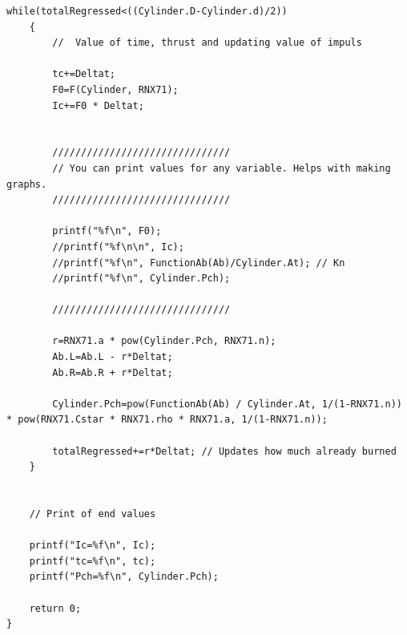 \documentclass{article}
\begin{document}
\begin{lstlisting}[style=CStyle]
	while(totalRegressed<((Cylinder.D-Cylinder.d)/2))
	{
		//  Value of time, thrust and updating value of impuls

		tc+=Deltat;
		F0=F(Cylinder, RNX71);
		Ic+=F0 * Deltat;
		
		
		///////////////////////////////
		// You can print values for any variable. Helps with making graphs.
		///////////////////////////////
		
		printf("%f\n", F0);
		//printf("%f\n\n", Ic);
		//printf("%f\n", FunctionAb(Ab)/Cylinder.At); // Kn
		//printf("%f\n", Cylinder.Pch);
		
		///////////////////////////////

		r=RNX71.a * pow(Cylinder.Pch, RNX71.n);
		Ab.L=Ab.L - r*Deltat;
		Ab.R=Ab.R + r*Deltat;

		Cylinder.Pch=pow(FunctionAb(Ab) / Cylinder.At, 1/(1-RNX71.n)) * pow(RNX71.Cstar * RNX71.rho * RNX71.a, 1/(1-RNX71.n));
		
		totalRegressed+=r*Deltat; // Updates how much already burned
	}


	// Print of end values
	
	printf("Ic=%f\n", Ic);
	printf("tc=%f\n", tc);	
	printf("Pch=%f\n", Cylinder.Pch);	

	return 0;
}
\end{lstlisting}
\newpage
\end{document}
